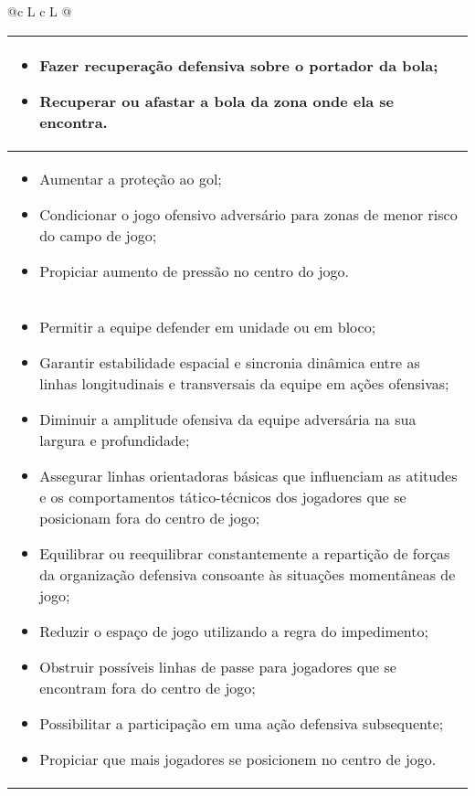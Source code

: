 \documentclass{article}
\begin{document}
\begin{table}
\begin{tabularx}{\linewidth}{@{}c L c L @{}}
\begin{tabular}[b]{@{}>{\centering\arraybackslash}p{\linewidth}@{}}
\begin{itemize}
				\item Fazer recuperação defensiva sobre o portador da bola;
				\item Recuperar ou afastar a bola da zona onde ela se encontra.
			\end{itemize}    \\
			\midrule
			\thead{Concentração}
			\begin{itemize}
				\item Aumentar a proteção ao gol;
				\item Condicionar o jogo ofensivo adversário para zonas de menor risco do campo de jogo;
				\item Propiciar aumento de pressão no centro do jogo.
			\end{itemize}    \\
			\midrule
			\thead{Unidade defensiva}
			\begin{itemize}
				\item Permitir a equipe defender em unidade ou em bloco;
				\item Garantir estabilidade espacial e sincronia dinâmica entre as linhas longitudinais e transversais da equipe em ações ofensivas;
				\item Diminuir a amplitude ofensiva da equipe adversária na sua largura e profundidade;
				\item Assegurar linhas orientadoras básicas que influenciam as atitudes e os comportamentos tático-técnicos dos jogadores que se posicionam fora do centro de jogo;
				\item Equilibrar ou reequilibrar constantemente a repartição de forças da organização defensiva consoante às situações momentâneas de jogo;
				\item Reduzir o espaço de jogo utilizando a regra do impedimento;
				\item Obstruir  possíveis linhas de passe para jogadores que se encontram  fora do centro de jogo;
				\item Possibilitar a participação em uma ação defensiva subsequente;
				\item Propiciar que mais jogadores se posicionem no centro de jogo.
			\end{itemize}
		\end{tabular}    \\
		\bottomrule
	\end{tabularx}
    \endgroup
\end{table}
\end{document}
